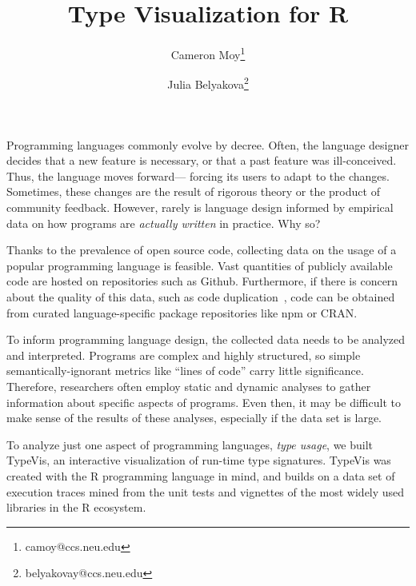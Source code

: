 \documentclass[review]{vgtc}                 %
\title{Type Visualization for R}
\author{Cameron Moy\thanks{camoy@ccs.neu.edu}
\and Julia Belyakova\thanks{belyakovay@ccs.neu.edu}}
\affiliation{\scriptsize Northeastern University}
\newcommand{\typevis}{{\sc TypeVis}\xspace}
\begin{document}

\maketitle

Programming languages commonly evolve by decree. Often, the language designer
decides that a new feature is necessary, or that a past feature was
ill-conceived. Thus, the language moves forward---
forcing its users to adapt to the changes.
Sometimes, these changes are the result of rigorous theory
or the product of community feedback. However, rarely is language design
informed by empirical data on how programs are \emph{actually
written} in practice. Why so?

Thanks to the prevalence of open source code, collecting data on
the usage of a popular programming language is feasible. Vast
quantities of publicly available code are hosted on repositories such as Github.
Furthermore, if there is concern about the quality of this data,
such as code duplication~\cite{lopes:2017},
code can be obtained from curated
language-specific package repositories like npm or CRAN.

To inform programming language design,
the collected data needs to be analyzed and interpreted.
Programs are complex and highly structured,
so simple semantically-ignorant metrics like ``lines of code'' carry little significance.
Therefore, researchers often employ static and dynamic analyses
to gather information about specific aspects of programs.
Even then, it may be difficult to make sense of the
results of these analyses,
especially if the data set is large.

To analyze just one aspect of programming languages, \emph{type usage}, we
built \typevis, an interactive visualization of run-time type signatures.
\typevis was created with the R programming language in mind,
and builds on a data set of execution traces
mined from the unit tests and vignettes
of the most widely used libraries in the R ecosystem.
\end{document}
